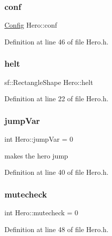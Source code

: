 \hypertarget{class_hero_adde89b9a9dcdfcb85d35ffa37b787714}{}\label{class_hero_adde89b9a9dcdfcb85d35ffa37b787714} 
\subsubsection{\texorpdfstring{conf}{conf}}
{\footnotesize\ttfamily \hyperlink{class_config}{Config} Hero\+::conf}



Definition at line 46 of file Hero.\+h.

\hypertarget{class_hero_a818f9a85aebe1f50a2d3ababa31f8e0a}{}\label{class_hero_a818f9a85aebe1f50a2d3ababa31f8e0a} 
\subsubsection{\texorpdfstring{helt}{helt}}
{\footnotesize\ttfamily sf\+::\+Rectangle\+Shape Hero\+::helt}



Definition at line 22 of file Hero.\+h.

\hypertarget{class_hero_ae881db3753a9ee23d80feed8d38b4dd6}{}\label{class_hero_ae881db3753a9ee23d80feed8d38b4dd6} 
\subsubsection{\texorpdfstring{jump\+Var}{jumpVar}}
{\footnotesize\ttfamily int Hero\+::jump\+Var = 0}



makes the hero jump 



Definition at line 40 of file Hero.\+h.

\hypertarget{class_hero_afa058b7a5c0fca85db2608b849d6be97}{}\label{class_hero_afa058b7a5c0fca85db2608b849d6be97} 
\subsubsection{\texorpdfstring{mutecheck}{mutecheck}}
{\footnotesize\ttfamily int Hero\+::mutecheck = 0}



Definition at line 48 of file Hero.\+h.

\hypertarget{class_hero_ad280a3af2955ebcaff431dc94b5757ab}{}\label{class_hero_ad280a3af2955ebcaff431dc94b5757ab} 
